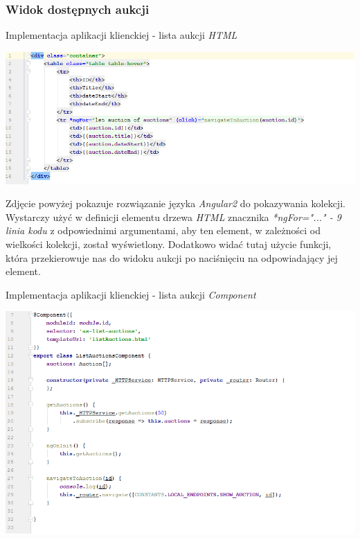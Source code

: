 \documentclass[10pt,titlepage]{article} %
\begin{document}
\subsubsection{Widok dostępnych aukcji}
\begin{listing}[H]
\caption[Implementacja aplikacji klienckiej - lista aukcji \textit{HTML}]{Implementacja aplikacji klienckiej - lista aukcji \textit{HTML}}
\includegraphics[width=\textwidth]{img/sekcja3/frontend/listowanieAukcjiHtml}
\end{listing}

Zdjęcie powyżej pokazuje rozwiązanie języka \textit{Angular2} do pokazywania kolekcji. Wystarczy użyć w definicji elementu drzewa \textit{HTML} znacznika \textit{*ngFor="..." - 9 linia kodu} z odpowiednimi argumentami, aby ten element, w zależności od wielkości kolekcji, został wyświetlony. Dodatkowo widać tutaj użycie funkcji, która przekierowuje nas do widoku aukcji po naciśnięciu na odpowiadający jej element.

\begin{listing}[H]
\caption[Implementacja aplikacji klienckiej - lista aukcji \textit{Component}]{Implementacja aplikacji klienckiej - lista aukcji \textit{Component}}
\includegraphics[width=\textwidth]{img/sekcja3/frontend/listowanieAukcjiComponent}
\end{listing}
\end{document}
